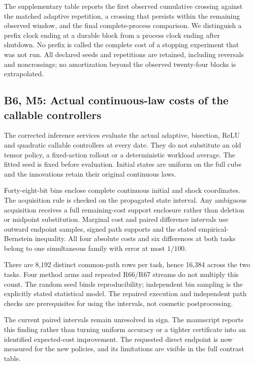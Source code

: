 \documentclass[ecta,nameyear,draft]{econsocart}
\begin{document}
The supplementary table reports the first observed cumulative crossing
against the matched adaptive repetition, a crossing that persists within
the remaining observed window, and the final complete-process
comparison. We distinguish a prefix clock ending at a durable block from
a process clock ending after shutdown. No prefix is called the complete
cost of a stopping experiment that was not run. All declared seeds and
repetitions are retained, including reversals and noncrossings; no
amortization beyond the observed twenty-four blocks is extrapolated.

\hypertarget{b6-m5-actual-continuous-law-costs-of-the-callable-controllers}{%
\subsection{B6, M5: Actual continuous-law costs of the callable
controllers}\label{b6-m5-actual-continuous-law-costs-of-the-callable-controllers}}

The corrected inference services evaluate the actual adaptive,
bisection, ReLU and quadratic callable controllers at every date. They
do not substitute an old tensor policy, a fixed-action rollout or a
deterministic workload average. The fitted seed is fixed before
evaluation. Initial states are uniform on the full cube and the
innovations retain their original continuous laws.

Forty-eight-bit bins enclose complete continuous initial and shock
coordinates. The acquisition rule is checked on the propagated state
interval. Any ambiguous acquisition receives a full remaining-cost
support enclosure rather than deletion or midpoint substitution.
Marginal cost and paired difference intervals use outward endpoint
samples, signed path supports and the stated empirical-Bernstein
inequality. All four absolute costs and six differences at both tasks
belong to one simultaneous family with error at most \(1/100\).

There are 8,192 distinct common-path rows per task, hence 16,384 across
the two tasks. Four method arms and repeated R66/R67 streams do not
multiply this count. The random seed binds reproducibility; independent
bin sampling is the explicitly stated statistical model. The repaired
execution and independent path checks are prerequisites for using the
intervals, not cosmetic postprocessing.

The current paired intervals remain unresolved in sign. The manuscript
reports this finding rather than turning uniform accuracy or a tighter
certificate into an identified expected-cost improvement. The requested
direct endpoint is now measured for the new policies, and its
limitations are visible in the full contrast table.
\end{document}
